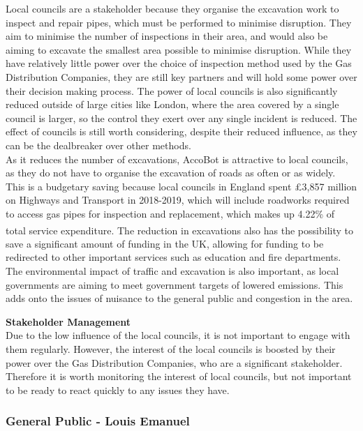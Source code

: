 \documentclass[11pt]{article}		%
\newcommand{\supercite}[1]{\textsuperscript{\cite{#1}}}		%
\begin{document}
			Local councils are a stakeholder because they organise the excavation work to inspect and repair pipes, which must be performed to minimise disruption.
			They aim to minimise the number of inspections in their area, and would also be aiming to excavate the smallest area possible to minimise disruption.
			While they have relatively little power over the choice of inspection method used by the Gas Distribution Companies, they are still key partners and will hold some power over their decision making process.
			The power of local councils is also significantly reduced outside of large cities like London, where the area covered by a single council is larger, so the control they exert over any single incident is reduced.
			The effect of councils is still worth considering, despite their reduced influence, as they can be the dealbreaker over other methods.
			\\
            \hspace*{3ex}As it reduces the number of excavations, AccoBot is attractive to local councils, as they do not have to organise the excavation of roads as often or as widely.
			This is a budgetary saving because local councils in England spent £3,857 million on Highways and Transport in 2018-2019, which will include roadworks required to access gas pipes for inspection and replacement, which makes up 4.22\% of total service expenditure\supercite{ministry2020local}.
			The reduction in excavations also has the possibility to save a significant amount of funding in the UK, allowing for funding to be redirected to other important services such as education and fire departments.
			The environmental impact of traffic and excavation is also important, as local governments are aiming to meet government targets of lowered emissions.
			This adds onto the issues of nuisance to the general public and congestion in the area.
			 
		    \textbf{Stakeholder Management}
		    \\
		    Due to the low influence of the local councils, it is not important to engage with them regularly.
		    However, the interest of the local councils is boosted by their power over the Gas Distribution Companies, who are a significant stakeholder.
		    Therefore it is worth monitoring the interest of local councils, but not important to be ready to react quickly to any issues they have.
		
		\subsubsection[General Public]{General Public - Louis Emanuel}
		
\end{document}
